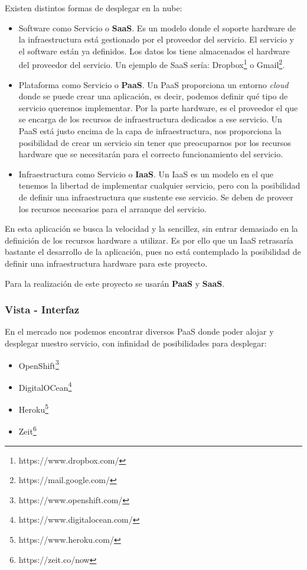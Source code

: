 Existen distintos formas de desplegar en la nube\cite{cloud}\cite{cloud2}\cite{cloud3}\cite{cloud4}:

\begin{itemize}
    \item Software como Servicio o \textbf{SaaS}. Es un modelo donde el soporte hardware de la infraestructura está gestionado por el proveedor del servicio. El servicio y el software están ya definidos. Los datos los tiene almacenados el  hardware del proveedor del servicio. Un ejemplo de SaaS sería: Dropbox\footnote{https://www.dropbox.com/} o Gmail\footnote{https://mail.google.com/}.
    \item Plataforma como Servicio o \textbf{PaaS}. Un PaaS proporciona un entorno \textit{cloud} donde se puede crear una aplicación, es decir, podemos definir qué tipo de servicio queremos implementar. Por la parte hardware, es el proveedor el que se encarga de los recursos de infraestructura dedicados a ese servicio. Un PaaS está justo encima de la capa de infraestructura, nos proporciona la posibilidad de crear un servicio sin tener que preocuparnos por los recursos hardware que se necesitarán para el correcto funcionamiento del servicio.
    \item Infraestructura como Servicio o \textbf{IaaS}. Un IaaS es un modelo en el que tenemos la libertad de implementar cualquier servicio, pero con la posibilidad de definir una infraestructura que sustente ese servicio. Se deben de proveer los recursos necesarios para el arranque del servicio.
\end{itemize}

En esta aplicación se busca la velocidad y la sencillez, sin entrar demasiado en la definición de los recursos hardware a utilizar. Es por ello que un IaaS retrasaría bastante el desarrollo de la aplicación, pues no está contemplado la posibilidad de definir una infraestructura hardware para este proyecto.

Para la realización de este proyecto se usarán \textbf{PaaS} y \textbf{SaaS}.

\subsubsection{Vista - Interfaz}

En el mercado nos podemos encontrar diversos PaaS donde poder alojar y desplegar nuestro servicio, con infinidad de posibilidades para desplegar:

\begin{itemize}
    \item OpenShift\footnote{https://www.openshift.com/} 
    \item DigitalOCean\footnote{https://www.digitalocean.com/}
    \item Heroku\footnote{https://www.heroku.com/}
    \item Zeit\footnote{https://zeit.co/now}
\end{itemize}

